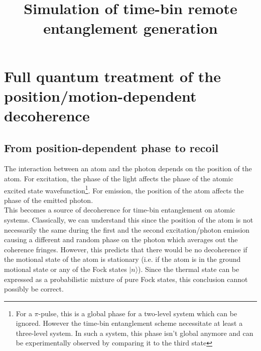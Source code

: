 \documentclass[10pt,fleqn]{article}
\title{Simulation of time-bin remote entanglement generation}
\begin{document}
\maketitle

\section{Full quantum treatment of the position/motion-dependent
  decoherence}

\subsection{From position-dependent phase to recoil}

The interaction between an atom and the photon depends on the position of the atom.
For excitation, the phase of the light affects the phase of the atomic excited state
wavefunction\footnote{For a $\pi$-pulse, this is a global phase for a two-level system
  which can be ignored. However the time-bin entanglement scheme necessitate at least
  a three-level system. In such a system,
  this phase isn't global anymore and can be experimentally observed
  by comparing it to the third state}.
For emission, the position of the atom affects the phase of the emitted photon.\\

This becomes a source of decoherence for time-bin entanglement on atomic systems.
Classically, we can understand this since the position of the atom is not necessarily
the same during the first and the second excitation/photon emission
causing a different and random phase on the photon which averages out
the coherence fringes. However, this predicts that there would be no decoherence
if the motional state of the atom is stationary
(i.e. if the atom is in the ground motional state
or any of the Fock states $|n\rangle$). Since the thermal state can be expressed
as a probabilistic mixture of pure Fock states, this conclusion
cannot possibly be correct.\\
\end{document}

